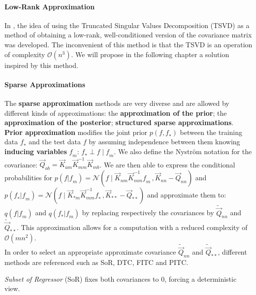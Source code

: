  \paragraph{Low-Rank Approximation}
 
 In \citet{foster_stable_2009}, the idea of using the Truncated Singular Values Decomposition (TSVD) as a method of obtaining a low-rank, well-conditioned version of the covariance matrix was developed. The inconvenient of this method is that the TSVD is an operation of complexity $\mathcal{O}(n^3)$. We will propose in the following chapter a solution inspired by this method. 

\paragraph{Sparse Approximations}

The \textbf{sparse approximation} methods are very diverse and are allowed by different kinds of approximations: the \textbf{approximation of the prior}; the \textbf{approximation of the posterior}; \textbf{structured sparse approximations}. \\

\textbf{Prior approximation} modifies the joint prior $p(\mathit{f,f_*})$ between the training data $\mathit{f}_*$ and the test data $\mathit{f}$ by assuming independence between them knowing \textbf{inducing variables} $\mathit{f}_m$: $\mathit{f}_* \perp \mathit{f} \; | \; \mathit{f}_m$. We also define the Nyström notation for the covariance: $\vec{Q}_{ab} = \vec{K}_{am} \vec{K}_{mm}^{-1} \vec{K}_{mb} $. We are then able to express the conditional probabilities for $p(\mathit{f} | \mathit{f}_m) = \mathcal{N}(\mathit{f} \; | \; \vec{K}_{nm}\vec{K}_{mm}^{-1}\mathit{f}_m \, , \vec{K}_{nn} - \vec{Q}_{nn})$ and  $p(\mathit{f}_* | \mathit{f}_m)  = \mathcal{N}(\mathit{f} \; | \; \vec{K}_{*m}\vec{K}_{mm}^{-1}\mathit{f}_* \, , \vec{K}_{**} - \vec{Q}_{**})$  and approximate them to: $q(\mathit{f} | \mathit{f}_m)$ and  $q(\mathit{f}_* | \mathit{f}_m)$ by replacing respectively the covariances by   $\tilde{\vec{Q}}_{nn}$ and $\tilde{\vec{Q}}_{**}$. This approximation allows for a computation with a reduced complexity of $\mathcal{O}(mn^2)$. \\

 In order to select an appropriate approximate covariance $\tilde{\vec{Q}}_{nn}$ and $\tilde{\vec{Q}}_{**}$, different methods are referenced such as  SoR, DTC, FITC and PITC.
 
 
 \textit{Subset of Regressor} (SoR) fixes both covariances to $0$, forcing a deterministic view. 
 
